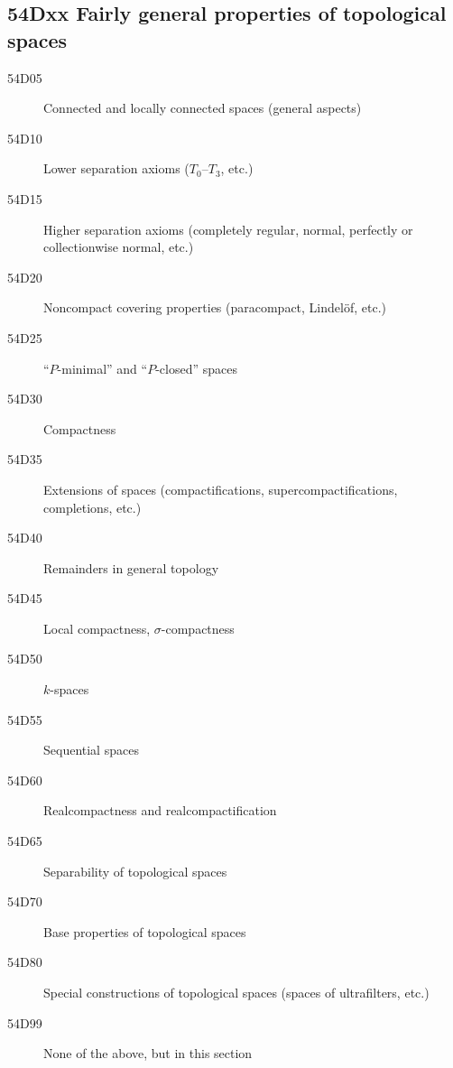 \subsection*{54Dxx  Fairly general properties of topological spaces}\label{54Dxx}
\begin{description}  
\item [54D05]\label{54D05} Connected and locally connected spaces (general aspects)
\item [54D10]\label{54D10} Lower separation axioms ($T_0$--$T_3$, etc.)
\item [54D15]\label{54D15} Higher separation axioms (completely regular, normal, perfectly or collectionwise normal, etc.)
\item [54D20]\label{54D20} Noncompact covering properties (paracompact, Lindel\"{o}f, etc.)
\item [54D25]\label{54D25} ``$P$-minimal'' and ``$P$-closed'' spaces
\item [54D30]\label{54D30} Compactness
\item [54D35]\label{54D35} Extensions of spaces (compactifications, supercompactifications, completions, etc.)
\item [54D40]\label{54D40} Remainders in general topology
\item [54D45]\label{54D45} Local compactness, $\sigma$-compactness
\item [54D50]\label{54D50} $k$-spaces
\item [54D55]\label{54D55} Sequential spaces
\item [54D60]\label{54D60} Realcompactness and realcompactification
\item [54D65]\label{54D65} Separability of topological spaces
\item [54D70]\label{54D70} Base properties of topological spaces
\item [54D80]\label{54D80} Special constructions of topological spaces (spaces of ultrafilters, etc.)
\item [54D99]\label{54D99} None of the above, but in this section
\end{description}
